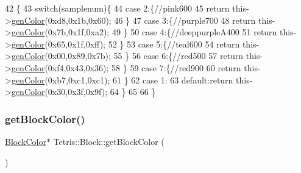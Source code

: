 \begin{DoxyCode}
42                                                                \{
43                 \textcolor{keywordflow}{switch}(samplenum)\{
44                     \textcolor{keywordflow}{case} 2:\{\textcolor{comment}{//pink600}
45                         \textcolor{keywordflow}{return} this->\hyperlink{class_tetris_1_1_block_a7362b9c1679a87823590a3c20ca53a55}{genColor}(0xd8,0x1b,0x60);
46                     \}
47                     \textcolor{keywordflow}{case} 3:\{\textcolor{comment}{//purple700}
48                         \textcolor{keywordflow}{return} this->\hyperlink{class_tetris_1_1_block_a7362b9c1679a87823590a3c20ca53a55}{genColor}(0x7b,0x1f,0xa2);
49                     \}
50                     \textcolor{keywordflow}{case} 4:\{\textcolor{comment}{//deeppurpleA400}
51                         \textcolor{keywordflow}{return} this->\hyperlink{class_tetris_1_1_block_a7362b9c1679a87823590a3c20ca53a55}{genColor}(0x65,0x1f,0xff);
52                     \}
53                     \textcolor{keywordflow}{case} 5:\{\textcolor{comment}{//teal600}
54                         \textcolor{keywordflow}{return} this->\hyperlink{class_tetris_1_1_block_a7362b9c1679a87823590a3c20ca53a55}{genColor}(0x00,0x89,0x7b);
55                     \}
56                     \textcolor{keywordflow}{case} 6:\{\textcolor{comment}{//red500}
57                         \textcolor{keywordflow}{return} this->\hyperlink{class_tetris_1_1_block_a7362b9c1679a87823590a3c20ca53a55}{genColor}(0xf4,0x43,0x36);
58                     \}
59                     \textcolor{keywordflow}{case} 7:\{\textcolor{comment}{//red900}
60                         \textcolor{keywordflow}{return} this->\hyperlink{class_tetris_1_1_block_a7362b9c1679a87823590a3c20ca53a55}{genColor}(0xb7,0xc1,0xc1);
61                     \}
62                     \textcolor{keywordflow}{case} 1:
63                     \textcolor{keywordflow}{default}:\textcolor{keywordflow}{return} this->\hyperlink{class_tetris_1_1_block_a7362b9c1679a87823590a3c20ca53a55}{genColor}(0x30,0x3f,0x9f);
64                 \}
65 
66             \}
\end{DoxyCode}
\mbox{\label{class_tetris_1_1_block_ad61aea379870fbb3668d49e4c3c748ed}} 
\subsubsection{\texorpdfstring{get\+Block\+Color()}{getBlockColor()}}
{\footnotesize\ttfamily \hyperlink{class_tetris_1_1_block_sub_modules_1_1_block_color}{Block\+Color}$\ast$ Tetris\+::\+Block\+::get\+Block\+Color (\begin{DoxyParamCaption}{ }\end{DoxyParamCaption})\hspace{0.3cm}{\ttfamily [inline]}}

